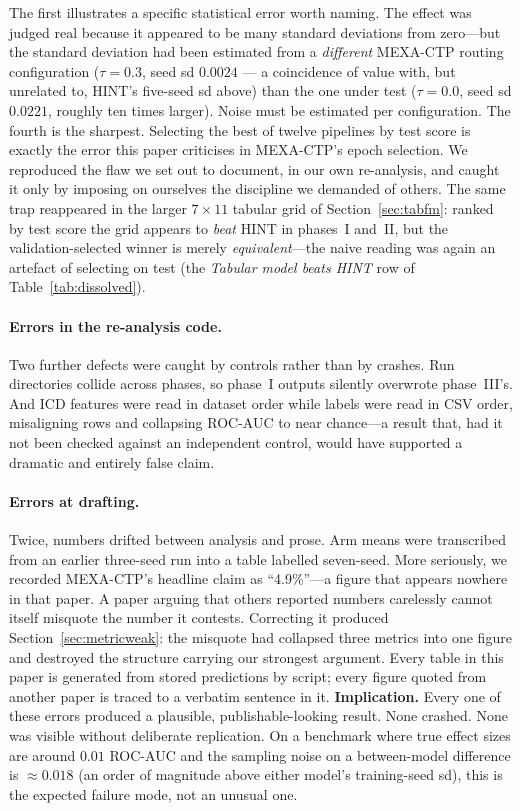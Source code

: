 \documentclass[a4paper,fleqn]{cas-sc}
\begin{document}
The first illustrates a specific statistical error worth naming. The effect was judged real
because it appeared to be many standard deviations from zero---but the standard deviation
had been estimated from a \emph{different} MEXA-CTP routing configuration ($\tau=0.3$, seed sd
$0.0024$ --- a coincidence of value with, but unrelated to, HINT's five-seed sd above) than
the one under test ($\tau=0.0$, seed sd $0.0221$, roughly ten times larger). Noise must be
estimated per configuration.
The fourth is the sharpest. Selecting the best of twelve pipelines by test score is exactly
the error this paper criticises in MEXA-CTP's epoch selection. We reproduced the flaw we set
out to document, in our own re-analysis, and caught it only by imposing on ourselves the
discipline we demanded of others. The same trap reappeared in the larger $7\times11$ tabular
grid of Section~\ref{sec:tabfm}: ranked by test score the grid appears to \emph{beat} HINT in
phases~I and~II, but the validation-selected winner is merely \emph{equivalent}---the naive
reading was again an artefact of selecting on test (the \emph{Tabular model beats HINT} row of Table~\ref{tab:dissolved}).
\paragraph{Errors in the re-analysis code.} Two further defects were caught by controls
rather than by crashes. Run directories collide across phases, so phase~I outputs silently
overwrote phase~III's. And ICD features were read in dataset order while labels were read in
CSV order, misaligning rows and collapsing ROC-AUC to near chance---a result that, had it not
been checked against an independent control, would have supported a dramatic and entirely
false claim.
\paragraph{Errors at drafting.} Twice, numbers drifted between analysis and prose. Arm means
were transcribed from an earlier three-seed run into a table labelled seven-seed. More
seriously, we recorded MEXA-CTP's headline claim as ``4.9\%''---a figure that appears nowhere
in that paper. A paper arguing that others reported numbers carelessly cannot itself misquote
the number it contests. Correcting it produced Section~\ref{sec:metricweak}: the misquote had
collapsed three metrics into one figure and destroyed the structure carrying our strongest
argument. Every table in this paper is generated from stored predictions by script; every
figure quoted from another paper is traced to a verbatim sentence in it.
\medskip
\noindent\textbf{Implication.} Every one of these errors produced a plausible,
publishable-looking result. None crashed. None was visible without deliberate replication. On
a benchmark where true effect sizes are around $0.01$ ROC-AUC and the sampling noise on a
between-model difference is $\approx0.018$ (an order of magnitude above either model's
training-seed sd), this is the expected failure mode, not an unusual one.
\end{document}
